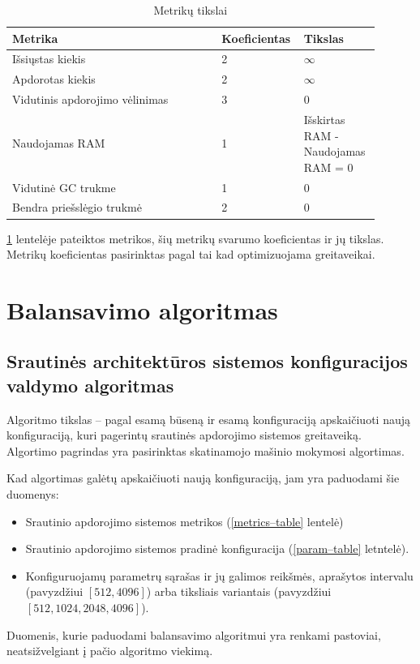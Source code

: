 \documentclass{VUMIFPSbakalaurinis}
\begin{document}
\begin{longtable}{|p{0.55\linewidth}|p{0.15\linewidth}|p{0.2\linewidth}|}
    \caption{Metrikų tikslai}
    \label{goal-table}\\
    \hline
    \rowcolor[HTML]{C0C0C0} 
    Metrika                         & Koeficientas & Tikslas          \\ \hline
    \endfirsthead
    \endhead
    Išsiųstas kiekis                & 2 & \(\infty\)  \\ \hline
    Apdorotas kiekis                & 2 & \(\infty\) \\ \hline
    Vidutinis apdorojimo vėlinimas  & 3 & 0    \\ \hline
    Naudojamas RAM                  & 1 & Išskirtas RAM - Naudojamas RAM = 0      \\ \hline
    Vidutinė GC trukme              & 1 & 0    \\ \hline
    Bendra priešslėgio trukmė       & 2 & 0    \\ \hline
\end{longtable}

\ref{goal-table} lentelėje pateiktos metrikos, šių metrikų svarumo koeficientas ir jų tikslas. Metrikų koeficientas pasirinktas pagal tai kad optimizuojama greitaveikai. 

\section{Balansavimo algoritmas}

\subsection{Srautinės architektūros sistemos konfiguracijos valdymo algoritmas}

Algoritmo tikslas – pagal esamą būseną ir esamą konfiguraciją apskaičiuoti naują konfiguraciją, kuri pagerintų srautinės apdorojimo sistemos greitaveiką. Algortimo pagrindas yra pasirinktas skatinamojo mašinio mokymosi algortimas.

Kad algortimas galėtų apskaičiuoti naują konfiguraciją, jam yra paduodami šie duomenys:
\begin{itemize}
    \item Srautinio apdorojimo sistemos metrikos (\ref{metrics–table} lentelė)
    \item Srautinio apdorojimo sistemos pradinė konfiguracija (\ref{param–table} letntelė).
    \item Konfiguruojamų parametrų sąrašas ir jų galimos reikšmės, aprašytos intervalu (pavyzdžiui \([512,4096]\)) arba tiksliais variantais (pavyzdžiui \([512, 1024, 2048, 4096]\)).
\end{itemize}
Duomenis, kurie paduodami balansavimo algoritmui yra renkami pastoviai, neatsižvelgiant į pačio algoritmo viekimą.
\end{document}
